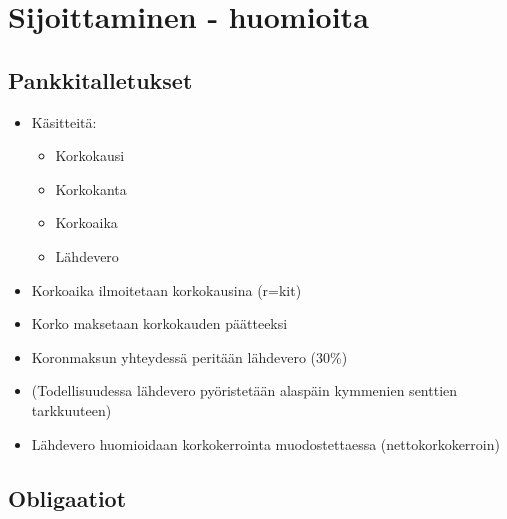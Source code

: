 \documentclass{article}
\begin{document}
\section{Sijoittaminen - huomioita}\label{sijoittaminen---huomioita}

\subsection{Pankkitalletukset}\label{pankkitalletukset}

\begin{itemize}
\itemsep1pt\parskip0pt
\item
  Käsitteitä:

  \begin{itemize}
  \itemsep1pt\parskip0pt
  \item
    Korkokausi
  \item
    Korkokanta
  \item
    Korkoaika
  \item
    Lähdevero
  \end{itemize}
\item
  Korkoaika ilmoitetaan korkokausina (r=kit)
\item
  Korko maksetaan korkokauden päätteeksi
\item
  Koronmaksun yhteydessä peritään lähdevero (30\%)
\item
  (Todellisuudessa lähdevero pyöristetään alaspäin kymmenien senttien
  tarkkuuteen)
\item
  Lähdevero huomioidaan korkokerrointa muodostettaessa
  (nettokorkokerroin)
\end{itemize}

\subsection{Obligaatiot}\label{obligaatiot}
\end{document}
